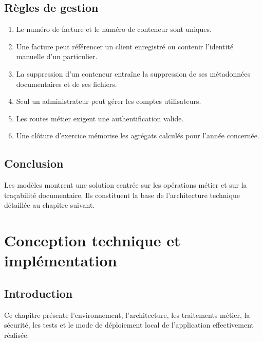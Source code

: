 \documentclass[12pt,a4paper,oneside]{report}
\begin{document}
\section{Règles de gestion}
\begin{enumerate}
  \item Le numéro de facture et le numéro de conteneur sont uniques.
  \item Une facture peut référencer un client enregistré ou contenir l'identité manuelle d'un particulier.
  \item La suppression d'un conteneur entraîne la suppression de ses métadonnées documentaires et de ses fichiers.
  \item Seul un administrateur peut gérer les comptes utilisateurs.
  \item Les routes métier exigent une authentification valide.
  \item Une clôture d'exercice mémorise les agrégats calculés pour l'année concernée.
\end{enumerate}

\section*{Conclusion}
Les modèles montrent une solution centrée sur les opérations métier et sur la traçabilité documentaire. Ils constituent la base de l'architecture technique détaillée au chapitre suivant.

\chapter{Conception technique et implémentation}
\section*{Introduction}
Ce chapitre présente l'environnement, l'architecture, les traitements métier, la sécurité, les tests et le mode de déploiement local de l'application effectivement réalisée.
\end{document}
